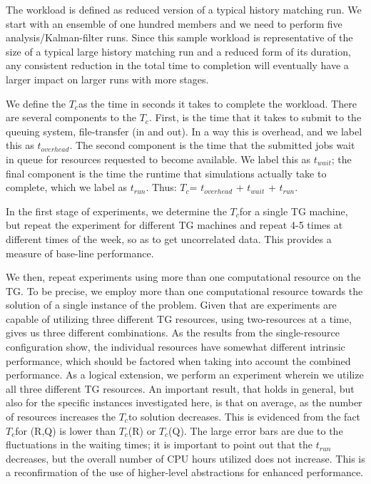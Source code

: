 \documentclass[conference,final]{IEEEtran}
\newcommand{\tc}{$T_c$}
\newcommand{\jhanote}[1]{ {\textcolor{red} { ***Jha: #1 }}}
\newcommand{\yyenote}[1]{ {\textcolor{blue} { ***yye00: #1 }}}
\newcommand{\jhanote}[1]{}
\newcommand{\yyenote}[1]{}
\begin{document}

The workload is defined as reduced version of a typical history
matching run. We start with an ensemble of one hundred members and we
need to perform five analysis/Kalman-filter runs. Since this sample
workload is representative of the size of a typical large history
matching run and a reduced form of its duration, any consistent
reduction in the total time to completion will eventually have a
larger impact on larger runs with more stages.

We define the \tc as the time in seconds it takes to complete the
workload. There are several components to the \tc. First, is the time
that it takes to submit to the queuing system, file-transfer (in and
out). In a way this is overhead, and we label this as $t_{overhead}$.
The second component is the time that the submitted jobs wait in queue
for resources requested to become available. We label this as
$t_{wait}$; the final component is the time the runtime that
simulations actually take to complete, which we label as
$t_{run}$. Thus: \tc = $t_{overhead}$ + $t_{wait}$ + $t_{run}$.

In the first stage of experiments, we determine the \tc for a single
TG machine, but repeat the experiment for different TG machines and
repeat 4-5 times at different times of the week, so as to get
uncorrelated data.  This provides a measure of base-line performance.

We then, repeat experiments using more than one computational resource
on the TG. To be precise, we employ more than one computational
resource towards the solution of a single instance of the problem.
Given that are experiments are capable of utilizing three different TG
resources, using two-resources at a time, gives us three different
combinations. As the results from the single-resource configuration
show, the individual resources have somewhat different intrinsic
performance, which should be factored when taking into account the
combined performance. As a logical extension, we perform an experiment
wherein we utilize all three different TG resources.  An important
result, that holds in general, but also for the specific instances
investigated here, is that on average, as the number of resources
increases the \tc to solution decreases. This is evidenced from the
fact \tc for (R,Q) is lower than \tc (R) or \tc (Q). The large error
bars are due to the fluctuations in the waiting times; it is important
to point out that the $t_{run}$ decreases, but the overall number of
CPU hours utilized does not increase. This is a reconfirmation of
the use of higher-level abstractions for enhanced performance.
\end{document}

